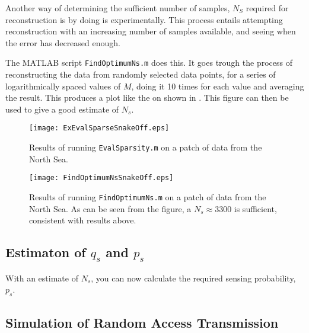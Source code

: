 \documentclass[Main]{subfiles}
\begin{document}
		Another way of determining the sufficient number of samples, $N_S$ required for reconstruction is by doing is experimentally.
		This process entails attempting reconstruction with an increasing number of samples available, and seeing when the error has decreased enough.

		The MATLAB script \texttt{FindOptimumNs.m} does this.
		It goes trough the process of reconstructing the data from randomly selected data points, for a series of logarithmically spaced values of $M$, doing it 10 times for each value and averaging the result.
		This produces a plot like the on shown in .
		This figure can then be used to give a good estimate of $N_s$.

		\begin{figure}[H]
			\centering 
			\texttt{[image: ExEvalSparseSnakeOff.eps]}
			\caption{
				Results of running \texttt{EvalSparsity.m} on a patch of data from the North Sea.}
			\label{fig:ExEvalSparseSnakeOff}
		\end{figure}

		\begin{figure}[H]
			\centering 
			\texttt{[image: FindOptimumNsSnakeOff.eps]}
			\caption{
				Results of running \texttt{FindOptimumNs.m} on a patch of data from the North Sea. As can be seen from the figure, a $N_s \approx 3300$ is sufficient, consistent with results above.}
			\label{fig:FindOptimumNsSnakeOff}
		\end{figure}



	

	\subsection{Estimaton of $q_s$ and $p_s$} %
	\label{sub:estimaton_of_q_s_and_p_s_}

		With an estimate of $N_s$, you can now calculate the required sensing probability, $p_s$.
	

	\subsection{Simulation of Random Access Transmission} %
	\label{sub:simulation_of_random_access_transmission}
\end{document}
